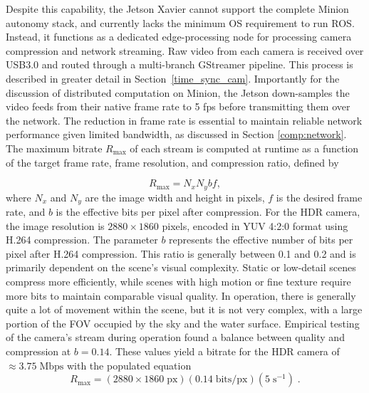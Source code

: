 \documentclass{erauthesis}
\begin{document}
Despite this capability, the Jetson Xavier cannot support the complete Minion autonomy stack, and currently lacks the minimum OS requirement to run \ac{ROS}. 
Instead, it functions as a dedicated edge-processing node for processing camera compression and network streaming. 
Raw video from each camera is received over USB3.0 and routed through a multi-branch GStreamer pipeline.
This process is described in greater detail in Section~\ref{time_sync_cam}. Importantly for the discussion of distributed computation on Minion, the Jetson down-samples the video feeds from their native frame rate to 5 \ac{fps} before transmitting them over the network.
The reduction in frame rate is essential to maintain reliable network performance given limited bandwidth, as discussed in Section \ref{comp:network}. 
The maximum bitrate $R_{\text{max}}$ of each stream is computed at runtime as a function of the target frame rate, frame resolution, and compression ratio, defined by

\begin{equation}
    R_{\text{max}} = N_x N_y b f,
\end{equation}
where $N_x$ and $N_y$ are the image width and height in pixels, $f$ is the desired frame rate, and $b$ is the effective bits per pixel after compression.
For the HDR camera, the image resolution is $2880 \times 1860$ pixels, encoded in YUV 4:2:0 format using H.264 compression.
The parameter $b$ represents the effective number of bits per pixel after H.264 compression. 
This ratio is generally between 0.1 and 0.2 and is primarily dependent on the scene's visual complexity. 
Static or low-detail scenes compress more efficiently, while scenes with high motion or fine texture require more bits to maintain comparable visual quality. 
In operation, there is generally quite a lot of movement within the scene, but it is not very complex, with a large portion of the \ac{FOV} occupied by the sky and the water surface.
Empirical testing of the camera's stream during operation found a balance between quality and compression at $b=0.14$.
These values yield a bitrate for the HDR camera of $\approx 3.75\; \text{Mbps}$ with the populated equation
\begin{equation}
        R_{\text{max}} = (2880 \times 1860\; \text{px}) (0.14 \;\text{bits/px})(5\;\text{s}^{-1})\;.
\end{equation}
\end{document}
